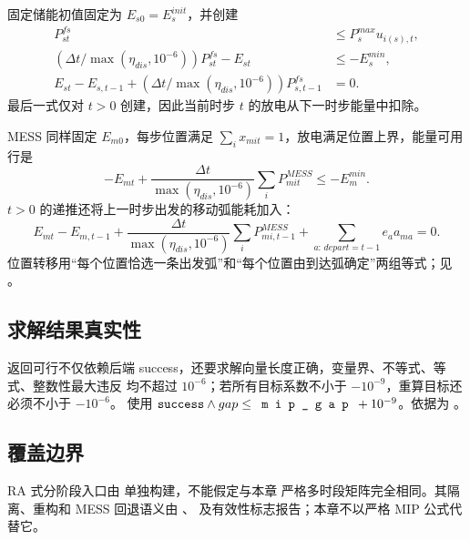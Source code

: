 固定储能初值固定为 $E_{s0}=E_s^{init}$，并创建
\begin{align}
 P^{fs}_{st}&\le P_s^{max}u_{i(s),t},\\
 (\Delta t/\max(\eta_{dis},10^{-6}))P^{fs}_{st}-E_{st}&\le-E_s^{min},\\
 E_{st}-E_{s,t-1}+(\Delta t/\max(\eta_{dis},10^{-6}))P^{fs}_{s,t-1}&=0.
\end{align}
最后一式仅对 $t>0$ 创建，因此当前时步 $t$ 的放电从下一时步能量中扣除。

MESS 同样固定 $E_{m0}$，每步位置满足 $\sum_ix_{mit}=1$，放电满足位置上界，能量可用行是
\begin{equation}
 -E_{mt}+\frac{\Delta t}{\max(\eta_{dis},10^{-6})}\sum_iP^{MESS}_{mit}
 \le-E_m^{min}.
\end{equation}
$t>0$ 的递推还将上一时步出发的移动弧能耗加入：
\begin{equation}
 E_{mt}-E_{m,t-1}+\frac{\Delta t}{\max(\eta_{dis},10^{-6})}
 \sum_iP^{MESS}_{mi,t-1}+\sum_{a:\,depart=t-1}e_a a_{ma}=0.
\end{equation}
位置转移用“每个位置恰选一条出发弧”和“每个位置由到达弧确定”两组等式；见
。

\subsection{求解结果真实性}

返回可行不仅依赖后端 success，还要求解向量长度正确，变量界、不等式、等式、整数性最大违反
均不超过 $10^{-6}$；若所有目标系数不小于 $-10^{-9}$，重算目标还必须不小于 $-10^{-6}$。
 使用
$\texttt{success}\land gap\le\fld{mip\_gap}+10^{-9}$。依据为
。

\subsection{覆盖边界}

RA 式分阶段入口由  单独构建，不能假定与本章
严格多时段矩阵完全相同。其隔离、重构和 MESS 回退语义由
、 及有效性标志报告；本章不以严格 MIP 公式代替它。

